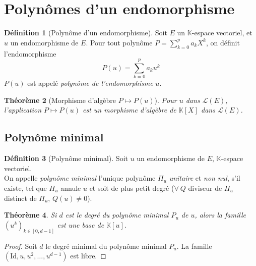 \documentclass[11pt,a4paper]{report}
\newtheorem{theorem}{Théorème}[chapter]
\theoremstyle{definition}
\newtheorem{dfn}[theorem]{Définition}
\begin{document}
\section{Polynômes d'un endomorphisme} %
\label{sec:polyn_mes_d_un_endomorphisme}
\begin{dfn}[Polynôme d'un endomorphisme]
     Soit $E$ un $\mathbb{K}$-espace vectoriel, et $u$ un endomorphisme de $E$. \newline
     Pour tout polynôme $P = \sum_{k=0}^p a_k X^k$, on définit l'endomorphisme 
     \begin{equation}
     P(u) = \sum_{k=0}^p a_k u^k
     \end{equation}
     $P(u)$ est appelé \emph{polynôme de l'endomorphisme} $u$.
\end{dfn}

\begin{theorem}[Morphisme d'algèbre $P \mapsto P(u)$]
     Pour $u$ dans $\mathscr{L}(E)$, l'application $P \mapsto P(u)$ est un \emph{morphisme d'algèbre} de $\mathbb{K} [X]$ dans $\mathscr{L}(E)$.\\
\end{theorem}
\subsection{Polynôme minimal}
\begin{dfn}[Polynôme minimal]
Soit $u$ un endomorphisme de $E$, $\mathbb{K}$-espace vectoriel. \\
On appelle \emph{polynôme minimal} l'unique polynôme $\Pi_u$ \emph{unitaire} et \emph{non nul}, s'il existe, tel que $\Pi_u$ annule $u$ et soit de plus petit degré ($\forall~Q$ diviseur de $\Pi_u$ distinct de $\Pi_u$, $Q(u)\neq 0$).
\end{dfn}
\begin{theorem}%
     Si $d$ est le degré du polynôme minimal $P_u$ de $u$, alors la famille $(u^k)_{k \in \left[ 0 , d-1 \right] }$ est une base de $\mathbb{K} [u]$.
\end{theorem}
\begin{proof}
     Soit $d$ le degré minimal du polynôme minimal $P_u$. La famille $(\mathrm{Id}, u, u^2, \ldots , u^{d-1} )$ est libre. 

\end{proof}
\end{document}

